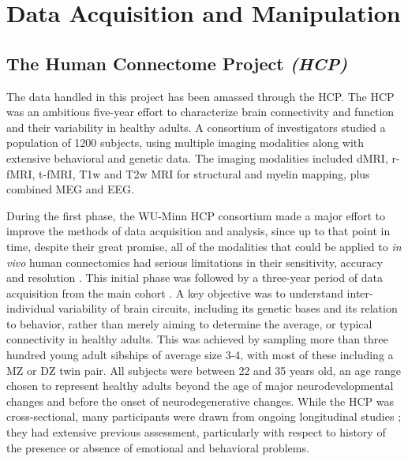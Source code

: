 \pagebreak
\chapter{Data Acquisition and Manipulation}
\label{sec:data}

\section{The Human Connectome Project \textit{(HCP)}}

The data handled in this project has been amassed through the \gls{HCP}. The \gls{HCP} was an ambitious five-year effort to characterize brain connectivity and function and their variability in healthy adults. A consortium of investigators studied a population of 1200 subjects, using multiple imaging modalities along with extensive behavioral and genetic data. The imaging modalities included \gls{dMRI}, \gls{r-fMRI}, \gls{t-fMRI}, \gls{T1w} and \gls{T2w} \gls{MRI} for structural and myelin mapping, plus combined \gls{MEG} and \gls{EEG}. 

During the first phase, the WU-Minn \gls{HCP} consortium made a major effort to improve the methods of data acquisition and analysis, since up to that point in time, despite their great promise, all of the modalities that could be applied to \textit{in vivo} human \gls{connectomics} had serious limitations in their sensitivity, accuracy and resolution \cite{VanEssen2012}. This initial phase was followed by a three-year period of data acquisition from the main cohort \cite{HCP}.
A key objective was to understand inter-individual variability of brain circuits, including its genetic bases and its relation to behavior, rather than merely aiming to determine the average, or typical connectivity in healthy adults. This was achieved by sampling more than three hundred young adult sibships of average size 3-4, with most of these including a \gls{MZ} or \gls{DZ} twin pair. All subjects were between 22 and 35 years old, an age range chosen to represent healthy adults beyond the age of major neurodevelopmental changes and before the onset of neurodegenerative changes. While the \gls{HCP} was cross-sectional, many participants were drawn from ongoing longitudinal studies \cite{Sartor2011, Edens2010}; they had extensive previous assessment, particularly with respect to history of the presence or absence of emotional and behavioral problems. 

